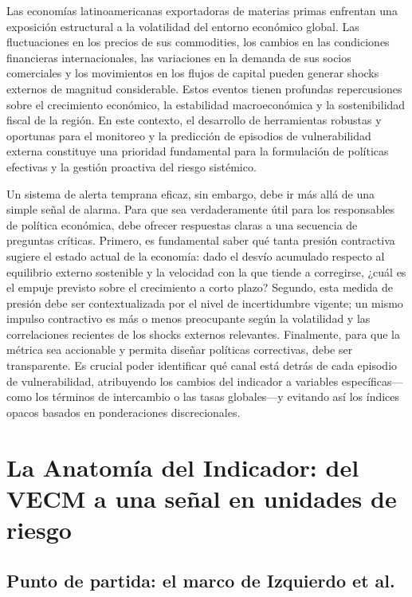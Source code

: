 \documentclass[11pt,a4paper]{article}
\numberwithin{equation}{section}
\begin{document}
Las economías latinoamericanas exportadoras de materias primas enfrentan una exposición estructural a la volatilidad del entorno económico global. Las fluctuaciones en los precios de sus commodities, los cambios en las condiciones financieras internacionales, las variaciones en la demanda de sus socios comerciales y los movimientos en los flujos de capital pueden generar shocks externos de magnitud considerable. Estos eventos tienen profundas repercusiones sobre el crecimiento económico, la estabilidad macroeconómica y la sostenibilidad fiscal de la región. En este contexto, el desarrollo de herramientas robustas y oportunas para el monitoreo y la predicción de episodios de vulnerabilidad externa constituye una prioridad fundamental para la formulación de políticas efectivas y la gestión proactiva del riesgo sistémico.

Un sistema de alerta temprana eficaz, sin embargo, debe ir más allá de una simple señal de alarma. Para que sea verdaderamente útil para los responsables de política económica, debe ofrecer respuestas claras a una secuencia de preguntas críticas. Primero, es fundamental saber qué tanta presión contractiva sugiere el estado actual de la economía: dado el desvío acumulado respecto al equilibrio externo sostenible y la velocidad con la que tiende a corregirse, ¿cuál es el empuje previsto sobre el crecimiento a corto plazo? Segundo, esta medida de presión debe ser contextualizada por el nivel de incertidumbre vigente; un mismo impulso contractivo es más o menos preocupante según la volatilidad y las correlaciones recientes de los shocks externos relevantes. Finalmente, para que la métrica sea accionable y permita diseñar políticas correctivas, debe ser transparente. Es crucial poder identificar qué canal está detrás de cada episodio de vulnerabilidad, atribuyendo los cambios del indicador a variables específicas---como los términos de intercambio o las tasas globales---y evitando así los índices opacos basados en ponderaciones discrecionales.

\section{La Anatomía del Indicador: del VECM a una señal en unidades de riesgo}

\subsection{Punto de partida: el marco de Izquierdo et al.}
\end{document}

